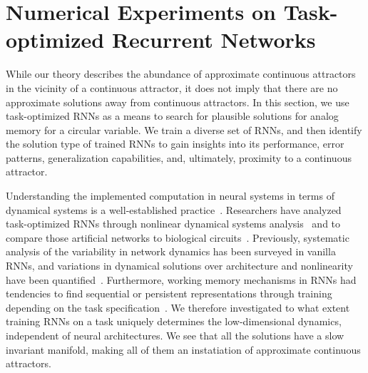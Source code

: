 \documentclass{article} %
\newcounter{ct}
\theoremstyle{definition}
\theoremstyle{remark}
\begin{document}
\section{Numerical Experiments on Task-optimized Recurrent Networks}\label{sec:experiments}

While our theory describes the abundance of approximate continuous attractors in the vicinity of a continuous attractor, it does not imply that there are no approximate solutions away from continuous attractors.
In this section, we use task-optimized RNNs as a means to search for plausible solutions for analog memory for a circular variable.
We train a diverse set of RNNs, and then identify the solution type of trained RNNs to gain insights into its performance, error patterns, generalization capabilities, and, ultimately, proximity to a continuous attractor.

Understanding the implemented computation in neural systems in terms of dynamical systems is a well-established practice~\citep{seung1996,sompolinsky1988}.
Researchers have analyzed task-optimized RNNs through nonlinear dynamical systems analysis~\citep{sussillo2013blackbox,sussillo2014,barak2013,driscoll2022,maheswaranathan2019universality,cueva2019headdirection,cueva2021continuous} and to compare those artificial networks to biological circuits~\citep{mante2013context,remington2018flexible,ghazizadeh2021slow}.
Previously, systematic analysis of the variability in network dynamics has been surveyed in vanilla RNNs, and variations in dynamical solutions over architecture and nonlinearity have been quantified~\citep{sussillo2013blackbox,mante2013context,yang2019task,maheswaranathan2019universality,driscoll2022}.
Furthermore, working memory mechanisms in RNNs had tendencies to find sequential or persistent representations through training depending on the task specification~\citep{orhan2019diverse}.
We therefore investigated to what extent training RNNs on a task uniquely determines the low-dimensional dynamics, independent of neural architectures.
We see that all the solutions have a slow invariant manifold, making all of them an instatiation of approximate continuous attractors.
\end{document}
